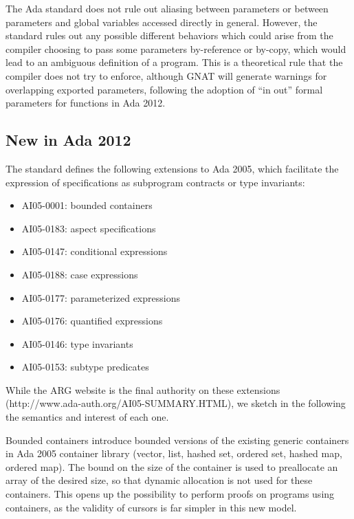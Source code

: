\documentclass{article}
\begin{document}
The Ada standard does not rule out aliasing between parameters or between
parameters and global variables accessed directly in general. However, the
standard rules out any possible different behaviors which could arise from the
compiler choosing to pass some parameters by-reference or by-copy, which would
lead to an ambiguous definition of a program. This is a theoretical rule that
the compiler does not try to enforce, although GNAT will generate warnings for
overlapping exported parameters, following the adoption of ``in out'' formal
parameters for functions in Ada 2012.

\subsection{New in Ada 2012}

The standard defines the following extensions to Ada 2005, which facilitate the
expression of specifications as subprogram contracts or type invariants:

\begin{itemize}
\item AI05-0001: bounded containers
\item AI05-0183: aspect specifications
\item AI05-0147: conditional expressions
\item AI05-0188: case expressions
\item AI05-0177: parameterized expressions
\item AI05-0176: quantified expressions
\item AI05-0146: type invariants
\item AI05-0153: subtype predicates
\end{itemize}

While the ARG website is the final authority on these extensions
(http://www.ada-auth.org/AI05-SUMMARY.HTML), we sketch in the following the
semantics and interest of each one.

Bounded containers introduce bounded versions of the existing generic
containers in Ada 2005 container library (vector, list, hashed set, ordered
set, hashed map, ordered map). The bound on the size of the container is used
to preallocate an array of the desired size, so that dynamic allocation is not
used for these containers. This opens up the possibility to perform proofs on
programs using containers, as the validity of cursors is far simpler in this
new model.
\end{document}
